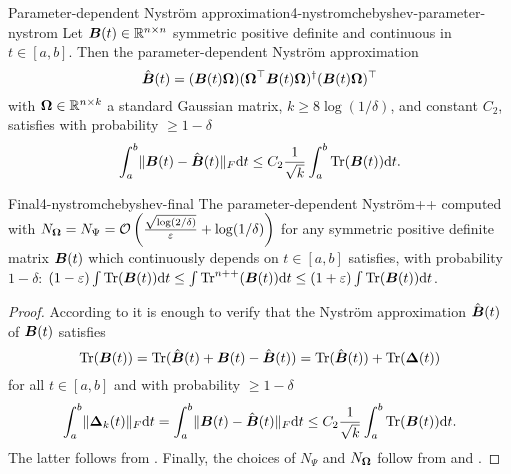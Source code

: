 \begin{lemma}{Parameter-dependent Nystr\"om approximation}{4-nystromchebyshev-parameter-nystrom}
    Let $\boldsymbol{B}(t) \in \mathbb{R}^{n \times n}$ symmetric positive definite and continuous in $t \in [a, b]$. Then the parameter-dependent Nystr\"om approximation
    \begin{equation}
        \hat{\boldsymbol{B}}(t) = (\boldsymbol{B}(t) \boldsymbol{\Omega}) (\boldsymbol{\Omega}^{\top} \boldsymbol{B}(t) \boldsymbol{\Omega})^{\dagger} (\boldsymbol{B}(t) \boldsymbol{\Omega})^{\top}
    \end{equation}
    with $\boldsymbol{\Omega} \in \mathbb{R}^{n \times k}$ a standard Gaussian matrix, $k \geq 8 \log(1/\delta)$, and constant $C_2$, satisfies with probability $\geq 1 - \delta$
    \begin{equation}
        \int_{a}^{b} \lVert \boldsymbol{B}(t) - \hat{\boldsymbol{B}}(t) \rVert _F \mathrm{d}t \leq C_2 \frac{1}{\sqrt{k}} \int_{a}^{b} \operatorname{Tr}(\boldsymbol{B}(t)) \mathrm{d}t.
    \end{equation}
\end{lemma}

\begin{theorem}{Final}{4-nystromchebyshev-final}
    The parameter-dependent Nystr\"om++ computed with $N_{\boldsymbol{\Omega}} = N_{\Psi} = \mathcal{O}\left( \frac{\sqrt{\log(2/\delta)}}{\varepsilon} + \log(1/\delta) \right)$ for any symmetric positive definite matrix $\boldsymbol{B}(t)$ which continuously depends on $t \in [a, b]$ satisfies, with probability $1 - \delta$: $(1 - \varepsilon) \int \operatorname{Tr}(\boldsymbol{B}(t)) \mathrm{d}t \leq \int \operatorname{Tr}^{n++}(\boldsymbol{B}(t)) \mathrm{d}t \leq  (1 + \varepsilon) \int \operatorname{Tr}(\boldsymbol{B}(t)) \mathrm{d}t$.
\end{theorem}

\begin{proof}
    According to  it is enough to verify that the Nystr\"om approximation $\hat{\boldsymbol{B}}(t)$ of $\boldsymbol{B}(t)$ satisfies
    \begin{equation}
        \operatorname{Tr}(\boldsymbol{B}(t)) = \operatorname{Tr}(\hat{\boldsymbol{B}}(t) + \boldsymbol{B}(t) - \hat{\boldsymbol{B}}(t)) = \operatorname{Tr}(\hat{\boldsymbol{B}}(t)) + \operatorname{Tr}(\boldsymbol{\Delta}(t))
    \end{equation}
    for all $t \in [a, b]$ and with probability $\geq 1 - \delta$
    \begin{equation}
        \int_{a}^{b} \lVert \boldsymbol{\Delta}_k(t) \rVert _F \mathrm{d}t = \int_{a}^{b} \lVert \boldsymbol{B}(t) - \hat{\boldsymbol{B}}(t) \rVert _F \mathrm{d}t \leq C_2 \frac{1}{\sqrt{k}} \int_{a}^{b} \operatorname{Tr}(\boldsymbol{B}(t)) \mathrm{d}t.
    \end{equation}
    The latter follows from . Finally, the choices of $N_{\Psi}$ and $N_{\boldsymbol{\Omega}}$ follow from  and .
\end{proof}

